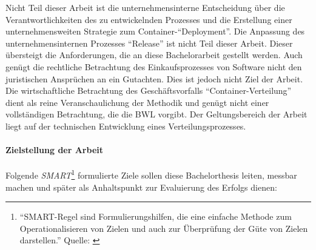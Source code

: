 \par
Nicht Teil dieser Arbeit ist die unternehmensinterne Entscheidung über die Verantwortlichkeiten des zu entwickelnden Prozesses und die Erstellung einer unternehmensweiten Strategie zum Container-\enquote{Deployment}. Die Anpassung des unternehmensinternen Prozesses \enquote{Release} ist nicht Teil dieser Arbeit. Dieser übersteigt die Anforderungen, die an diese Bachelorarbeit gestellt werden. Auch genügt die rechtliche Betrachtung des Einkaufsprozesses von Software nicht den juristischen Ansprüchen an ein Gutachten. Dies ist jedoch nicht Ziel der Arbeit. Die wirtschaftliche Betrachtung des Geschäftsvorfalls  \enquote{Container-Verteilung} dient als reine Veranschaulichung der Methodik und genügt nicht einer vollständigen Betrachtung, die die \ac{BWL} vorgibt. Der Geltungsbereich der Arbeit liegt auf der technischen Entwicklung eines Verteilungsprozesses.

\paragraph{Zielstellung der Arbeit}\label{kap:einleitung:Ziele}
Folgende \textit{SMART}\footnote{\enquote{SMART-Regel sind Formulierungshilfen, die eine einfache Methode zum Operationalisieren von Zielen und auch zur Überprüfung der Güte von Zielen darstellen.} Quelle: \cite[][S.69]{dechange_projektmanagement_2020}} formulierte Ziele sollen diese Bachelorthesis leiten, messbar machen und später als Anhaltspunkt zur Evaluierung des Erfolgs dienen:

